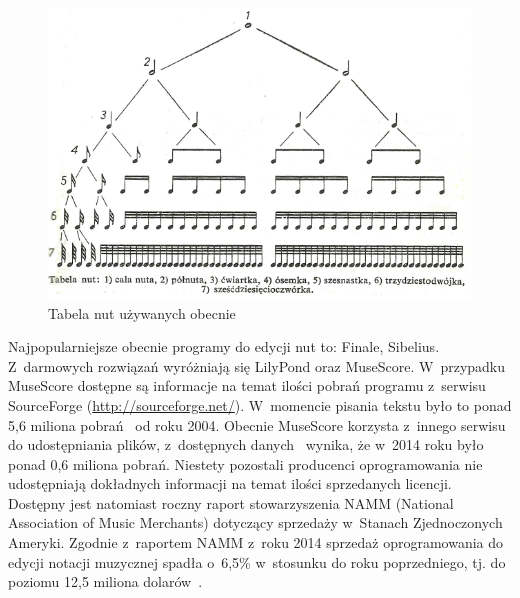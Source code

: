 \documentclass[polish,thesis,12pt]{dcsbook}
\begin{document}
\begin{figure}[H]
	\centering
  \includegraphics[scale=1.5,bb=0 0 295 202]{img/nuty.pdf}
  \caption{Tabela nut używanych obecnie~\cite{Encyklopedia}}
  \label{nuty}
\end{figure}

Najpopularniejsze obecnie programy do edycji nut to: Finale, Sibelius. Z~darmowych rozwiązań wyróżniają się LilyPond oraz MuseScore. W~przypadku MuseScore dostępne są informacje na temat ilości pobrań programu z~serwisu SourceForge (\url{http://sourceforge.net/}). W~momencie pisania tekstu było to ponad 5,6 miliona pobrań~\cite{SourceForge} od roku 2004. Obecnie MuseScore korzysta z~innego serwisu do udostępniania plików, z~dostępnych danych~\cite{OSUOpenSourceLab} wynika, że w~2014 roku było ponad 0,6 miliona pobrań. Niestety pozostali producenci oprogramowania nie udostępniają dokładnych informacji na temat ilości sprzedanych licencji. Dostępny jest natomiast roczny raport stowarzyszenia NAMM (National Association of Music Merchants) dotyczący sprzedaży w~Stanach Zjednoczonych Ameryki. Zgodnie z~raportem NAMM z~roku 2014 sprzedaż oprogramowania do edycji notacji muzycznej spadła o~6,5\% w~stosunku do roku poprzedniego, tj. do poziomu 12,5 miliona dolarów~\cite{NAMM}.
\end{document}
